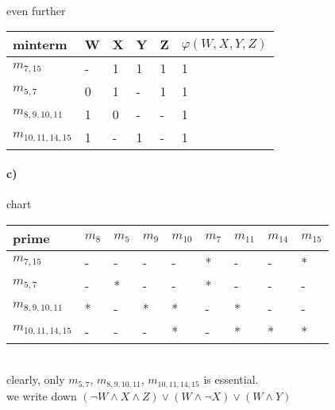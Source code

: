 \documentclass{article}
\begin{document}
\\
even further \\
\begin{tabular}{ | p{2cm} | p{1cm} | p{1cm} | p{1cm} | p{1cm} | p{3cm} |}
    \hline
    minterm & W & X & Y & Z & $\varphi(W, X, Y, Z)$ \\
    \hline
    $m_{7,15}$ & - & 1 & 1 & 1 & 1 \\
    $m_{5,7}$ & 0 & 1 & - & 1 & 1 \\
    $m_{8,9,10,11}$ & 1 & 0 & - & - & 1 \\
    $m_{10,11,14,15}$ & 1 & - & 1 & - & 1 \\
    \hline
\end{tabular}

\paragraph{c)}
chart \\
\begin{tabular}{ | p{2cm} | p{1cm} | p{1cm} | p{1cm} | p{1cm} | p{1cm} | p{1cm} | p{1cm} | p{1cm} | }
    \hline
    prime & $m_8$ & $m_5$ & $m_9$ & $m_{10}$ & $m_7$ & $m_{11}$ & $m_{14}$ & $m_{15}$ \\
    \hline
    $m_{7,15}$ & - & - & - & - & * & - & - & * \\
    $m_{5,7}$ & - & * & - & - & * & - & - & - \\
    $m_{8,9,10,11}$ & * & - & * & * & - & * & - & - \\
    $m_{10,11,14,15}$ & - & - & - & * & - & * & * & * \\
    \hline
\end{tabular}
\\
clearly, only $m_{5,7}$, $m_{8,9,10,11}$, $m_{10,11,14,15}$ is essential. \\
we write down $(\neg W \land X \land Z) \lor (W \land \neg X) \lor (W \land Y)$
\end{document}
